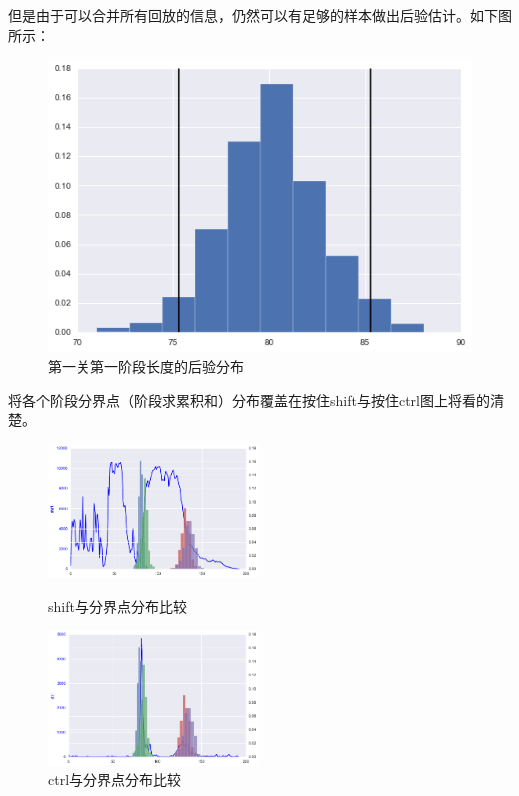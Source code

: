\documentclass[UTF8]{ctexart}
\begin{document}
但是由于可以合并所有回放的信息，仍然可以有足够的样本做出后验估计。如下图所示：

\begin{figure}[H]
\centering
\includegraphics[width=\linewidth]{images/dhist.png}
\caption{第一关第一阶段长度的后验分布}
\end{figure}

将各个阶段分界点（阶段求累积和）分布覆盖在按住shift与按住ctrl图上将看的清楚。

\begin{figure}[H]
\begin{minipage}[t]{0.5\linewidth}
\centering
\includegraphics[width=2.2in]{images/biHistShift.png}
\caption{shift与分界点分布比较}
\end{minipage}%
\begin{minipage}[t]{0.5\linewidth}
\centering
\includegraphics[width=2.2in]{images/biHistCtrl.png}
\caption{ctrl与分界点分布比较}
\end{minipage}
\end{figure}
\end{document}

